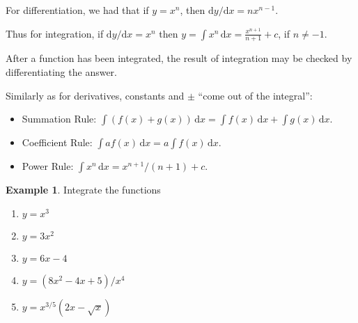 \documentclass[
  11pt,
  oneside]{book}
\providecommand{\tightlist}{%
  \setlength{\itemsep}{0pt}\setlength{\parskip}{0pt}}
\newcommand{\slide}{}
\theoremstyle{definition}
\theoremstyle{definition}
\newtheorem{example}{Example}[chapter]
\theoremstyle{definition}
\theoremstyle{definition}
\theoremstyle{remark}
\begin{document}
For differentiation, we had that if \(y = x^n\), then \(\mathrm{d}y/\mathrm{d} x= nx^{n-1}\).

Thus for integration, if \(\mathrm{d}y/\mathrm{d}x = x^n\) then \(y=\displaystyle\int x^n \,\mathrm{d}x = \frac{x^{n+1}}{n+1} + c\), if \(n \ne -1\).

After a function has been integrated, the result of integration may be checked by differentiating the answer.

\slide

Similarly as for derivatives, constants and \(\pm\) ``come out of the integral'':

\begin{itemize}
\tightlist
\item
  Summation Rule: \(\displaystyle\int(f(x)+g(x))\,\mathrm{d}x = \displaystyle\int f(x)\,\mathrm{d}x + \displaystyle\int g(x)\,\mathrm{d}x\).
\item
  Coefficient Rule: \(\displaystyle\int af(x)\,\mathrm{d}x = a\displaystyle\int f(x)\,\mathrm{d}x\).
\item
  Power Rule: \(\displaystyle\int x^n \,\mathrm{d}x = x^{n+1}/(n+1) + c\).
\end{itemize}

\slide

\begin{example}

Integrate the functions

\begin{enumerate}
\def\labelenumi{\arabic{enumi}.}
\tightlist
\item
  \(y=x^3\)
\item
  \(y=3x^2\)
\item
  \(y=6x-4\)
\item
  \(y=(8x^2-4x+5)/x^4\)
\item
  \(y=x^{3/5}(2x-\sqrt{x})\)
\end{enumerate}

\end{example}
\end{document}
